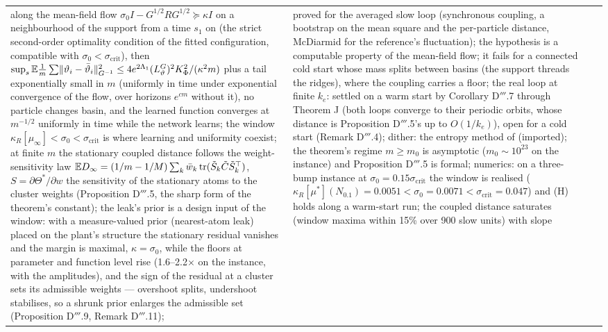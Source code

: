 {\begin{longtable}{@{}>{\raggedright\arraybackslash}p{}>{\raggedright\arraybackslash}p{}%
>{\raggedright\arraybackslash}p{}>{\raggedright\arraybackslash}p{}@{}}
along the mean-field flow $\sigma_0I - G^{1/2}RG^{1/2}\succeq\kappa I$ on a neighbourhood of the support from a time
$s_1$ on (the strict second-order optimality condition of the fitted configuration, compatible with
$\sigma_0 < \sigma_{\mathrm{crit}}$), then
$\sup_s\mathbb{E}\frac1m\sum\lVert \vartheta_i - \bar\vartheta_i\rVert^2_{G^{-1}}\le4e^{2\Lambda_1}(L_\vartheta^G)^2K_\Phi^2/(\kappa^2m)$
plus a tail exponentially small in $m$ (uniformly in time under exponential convergence of the flow, over horizons
$e^{cm}$ without it), no particle changes basin, and the learned function converges at $m^{-1/2}$ uniformly in time
while the network learns; the window $\kappa_R[\mu_\infty] < \sigma_0 < \sigma_{\mathrm{crit}}$ is where learning
and uniformity coexist; at finite $m$ the stationary coupled distance follows the weight-sensitivity law
$\mathbb{E} D_\infty = (1/m - 1/M)\sum_k\bar w_k\operatorname{tr}(\tilde S_k\tilde C\tilde S_k^\top)$, $S = \partial\Theta^*/\partial w$ the
sensitivity of the stationary atoms to the cluster weights (Proposition D$'''$.5, the sharp form of the theorem's
constant); the leak's prior is a design input of the window: with a measure-valued prior (nearest-atom leak) placed
on the plant's structure the stationary residual vanishes and the margin is maximal, $\kappa = \sigma_0$, while the
floors at parameter and function level rise (1.6--2.2$\times$ on the instance, with the amplitudes), and the sign of
the residual at a cluster sets its admissible weights --- overshoot splits, undershoot stabilises, so a shrunk prior
enlarges the admissible set (Proposition D$'''$.9, Remark D$'''$.11);
& proved for the averaged slow loop (synchronous coupling, a bootstrap on the mean square and the per-particle
distance, McDiarmid for the reference's fluctuation); the hypothesis is a computable property of the mean-field flow;
it fails for a connected cold start whose mass splits between basins (the support threads the ridges), where the
coupling carries a floor; the real loop at finite $k_e$: settled on a warm start by Corollary D$'''$.7 through
Theorem J (both loops converge to their periodic orbits, whose distance is Proposition D$'''$.5's up to $O(1/k_e)$),
open for a cold start (Remark D$'''$.4); dither: the entropy method of \cite{S5} (imported); the theorem's regime
$m\ge m_0$ is asymptotic ($m_0\sim10^{23}$ on the instance) and Proposition D$'''$.5 is formal; numerics: on a
three-bump instance at $\sigma_0 = 0.15\sigma_{\mathrm{crit}}$ the window is realised
($\kappa_R[\mu^*](N_{0.1}) = 0.0051 < \sigma_0 = 0.0071 < \sigma_{\mathrm{crit}} = 0.047$) and (H) holds along a
warm-start run; the coupled distance saturates (window maxima within 15\% over 900 slow units) with slope

\end{longtable}}
